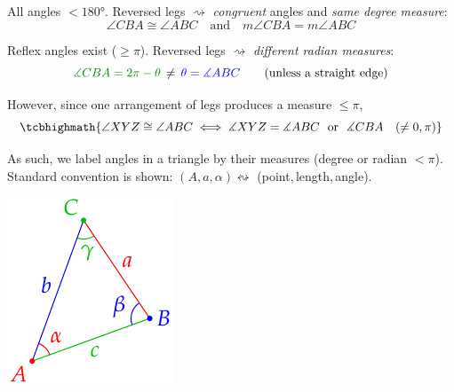 \begin{description}\itemsep0pt
  \item[Euclidean geometry] All angles $<\ang{180}$. Reversed legs $\rightsquigarrow$ \emph{congruent} angles and \emph{same degree measure}:
   \[
   	\angle CBA\cong\angle ABC\quad\text{and}\quad  m\angle CBA=m\angle ABC
   \]
  \item[Analytic geometry] Reflex angles exist ($\ge\pi$). Reversed legs $\rightsquigarrow$ \emph{different radian measures}:
  \[
  	\textcolor{Green}{\measuredangle CBA=2\pi-\theta}\, \neq \, \textcolor{blue}{\theta=\measuredangle ABC} \tag{unless a straight edge}
  \]
	\begin{minipage}[t]{0.77\linewidth}\vspace{-5pt}
   	However, since one arrangement of legs produces a measure $\le\pi$,
   	\[
  		\tcbhighmath{\angle XYZ\cong \angle ABC \iff \measuredangle XYZ=\measuredangle ABC\ \text{ or }\ \measuredangle CBA \quad(\neq 0,\pi)}
 		\]

		As such, we label angles in a triangle by their measures (degree or radian $<\pi$). Standard convention is shown: $(A,a,\alpha)\leftrightsquigarrow$ (point,\,length,\,angle).
	\end{minipage}
	\hfill
	\begin{minipage}[t]{0.2\linewidth}\vspace{-15pt}
		\flushright\includegraphics[scale=0.95]{angle-notation}
	\end{minipage}
\end{description}




